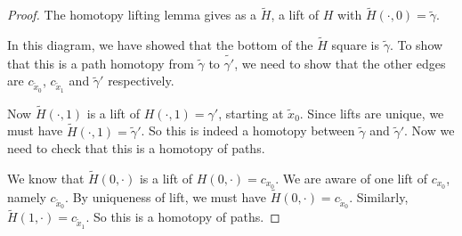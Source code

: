 \documentclass[a4paper]{article}
\begin{document}
\begin{proof}
  The homotopy lifting lemma gives as a $\tilde{H}$, a lift of $H$ with $\tilde{H}(\cdot, 0) = \tilde{\gamma}$.
  \begin{center}
  \end{center}
  In this diagram, we have showed that the bottom of the $\tilde{H}$ square is $\tilde{\gamma}$. To show that this is a path homotopy from $\tilde{\gamma}$ to $\tilde{\gamma'}$, we need to show that the other edges are $c_{\tilde{x}_0}$, $c_{\tilde{x}_1}$ and $\tilde{\gamma}'$ respectively.


  Now $\tilde{H}(\cdot, 1)$ is a lift of $H(\cdot, 1) = \gamma'$, starting at $\tilde{x}_0$. Since lifts are unique, we must have $\tilde{H}(\cdot, 1) = \tilde{\gamma}'$. So this is indeed a homotopy between $\tilde{\gamma}$ and $\tilde{\gamma}'$. Now we need to check that this is a homotopy of paths.

  We know that $\tilde{H}(0, \cdot)$ is a lift of $H(0, \cdot) = c_{x_0}$. We are aware of one lift of $c_{x_0}$, namely $c_{\tilde{x}_0}$. By uniqueness of lift, we must have $\tilde{H}(0, \cdot) = c_{\tilde{x}_0}$. Similarly, $\tilde{H}(1, \cdot) = c_{\tilde{x}_1}$. So this is a homotopy of paths.
\end{proof}
\end{document}
